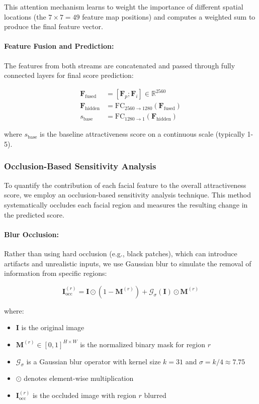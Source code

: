 This attention mechanism learns to weight the importance of different spatial locations (the $7 \times 7 = 49$ feature map positions) and computes a weighted sum to produce the final feature vector.

\paragraph{Feature Fusion and Prediction:}
The features from both streams are concatenated and passed through fully connected layers for final score prediction:

\begin{align}
\mathbf{F}_{\text{fused}} &= [\mathbf{F}_p; \mathbf{F}_i] \in \mathbb{R}^{2560} \\
\mathbf{F}_{\text{hidden}} &= \text{FC}_{2560 \to 1280}(\mathbf{F}_{\text{fused}}) \\
s_{\text{base}} &= \text{FC}_{1280 \to 1}(\mathbf{F}_{\text{hidden}})
\end{align}

where $s_{\text{base}}$ is the baseline attractiveness score on a continuous scale (typically 1-5).

\subsubsection{Occlusion-Based Sensitivity Analysis}

To quantify the contribution of each facial feature to the overall attractiveness score, we employ an occlusion-based sensitivity analysis technique. This method systematically occludes each facial region and measures the resulting change in the predicted score.

\paragraph{Blur Occlusion:}
Rather than using hard occlusion (e.g., black patches), which can introduce artifacts and unrealistic inputs, we use Gaussian blur to simulate the removal of information from specific regions:

\begin{equation}
\mathbf{I}_{\text{occ}}^{(r)} = \mathbf{I} \odot (1 - \mathbf{M}^{(r)}) + \mathcal{G}_{\sigma}(\mathbf{I}) \odot \mathbf{M}^{(r)}
\end{equation}

where:
\begin{itemize}
    \item $\mathbf{I}$ is the original image
    \item $\mathbf{M}^{(r)} \in [0,1]^{H \times W}$ is the normalized binary mask for region $r$
    \item $\mathcal{G}_{\sigma}$ is a Gaussian blur operator with kernel size $k=31$ and $\sigma = k/4 \approx 7.75$
    \item $\odot$ denotes element-wise multiplication
    \item $\mathbf{I}_{\text{occ}}^{(r)}$ is the occluded image with region $r$ blurred
\end{itemize}

